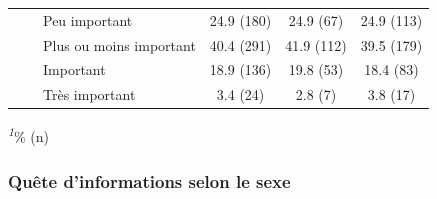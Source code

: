 \documentclass[
]{article}
\begin{document}
\begin{table}[!t]
\begin{tabular*}{\linewidth}{@{\extracolsep{\fill}}lccc}
    Peu important & 24.9 (180) & 24.9 (67) & 24.9 (113) \\ 
    Plus ou moins important & 40.4 (291) & 41.9 (112) & 39.5 (179) \\ 
    Important & 18.9 (136) & 19.8 (53) & 18.4 (83) \\ 
    Très important & 3.4 (24) & 2.8 (7) & 3.8 (17) \\ 
\bottomrule
\end{tabular*}
\begin{minipage}{\linewidth}
\textsuperscript{\textit{1}}\% (n)\\
\end{minipage}
\end{table}

\hypertarget{quuxeate-dinformations-selon-le-sexe}{%
\subsubsection{Quête d'informations selon le
sexe}\label{quuxeate-dinformations-selon-le-sexe}}
\end{document}
